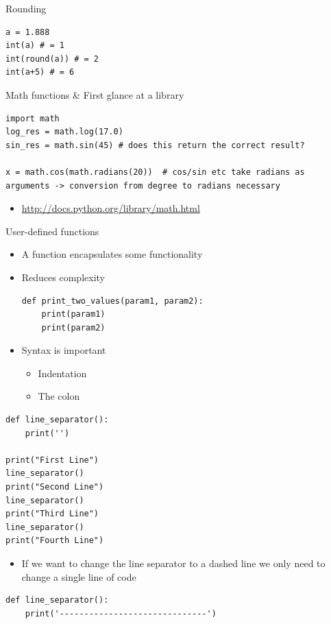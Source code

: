 \documentclass[10pt, a4paper]{beamer} %
\begin{document}
\begin{frame}
\framebreak

\begin{block}{Rounding}
    \begin{lstlisting}
a = 1.888
int(a) # = 1
int(round(a)) # = 2
int(a+5) # = 6
    \end{lstlisting}
\end{block}
\begin{block}{Math functions \& First glance at a library}
    \begin{lstlisting}
import math
log_res = math.log(17.0)
sin_res = math.sin(45) # does this return the correct result?

x = math.cos(math.radians(20))  # cos/sin etc take radians as arguments -> conversion from degree to radians necessary      
    \end{lstlisting}
    \begin{itemize}
        \item \tiny \url{http://docs.python.org/library/math.html}
    \end{itemize}
\end{block}

\framebreak

\begin{block}{User-defined functions}
    \begin{itemize}
        \item A function encapsulates some functionality
        \item Reduces complexity
        \begin{lstlisting}
def print_two_values(param1, param2):
    print(param1)
    print(param2)            
        \end{lstlisting}
        \item Syntax is important
        \begin{itemize}
            \item Indentation
            \item The colon
        \end{itemize}
    \end{itemize}
\end{block}
\framebreak
\begin{examples}
    \begin{lstlisting}
def line_separator():
    print('')

print("First Line")
line_separator()
print("Second Line")
line_separator()
print("Third Line")
line_separator()
print("Fourth Line")
\end{lstlisting}
\end{examples}
\begin{itemize}
    \item If we want to change the line separator to a dashed line we only need to change a single line of code
\end{itemize}
\begin{lstlisting}
def line_separator():
    print('------------------------------')
\end{lstlisting}



\end{frame}
\end{document}
